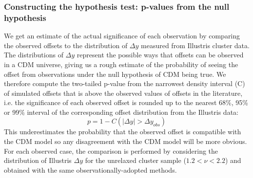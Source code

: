 \documentclass[usenatbib]{mn2e}
\begin{document}
{\subsubsection{Constructing the hypothesis test: p-values from the null hypothesis} 
\label{subsec:hypothesis_test}

We get an estimate of the actual significance of each observation by comparing the
observed offsets to the distribution of $\Delta y$ measured from Illustris cluster data. 
The distributions of $\Delta y$ represent the possible ways that offsets can be observed in a CDM
universe, giving us a rough estimate of the probability 
of seeing the offset from observations under the null hypothesis of CDM 
being true. 
We therefore compute the two-tailed 
p-value from the narrowest density interval (C) of simulated offsets 
that is above the observed values of offsets in the literature, 
i.e. the significance of each observed offset is rounded up to the nearest 68\%, 95\% or 99\%
interval of the corresponding offset distribution from the Illustris data:
\begin{equation}
	p = 1 - C(|\Delta y| > \Delta y_{obs})
\end{equation}
This underestimates the probability that the
observed offset is compatible with the CDM model so
any disagreement with the CDM model will be more obvious. 
For each observed case, the comparison is performed by considering the distribution of Illustris $\Delta y$ for the unrelaxed cluster sample ($1.2 < \nu < 2.2$) and obtained with the same observationally-adopted methods.

}
\end{document}
